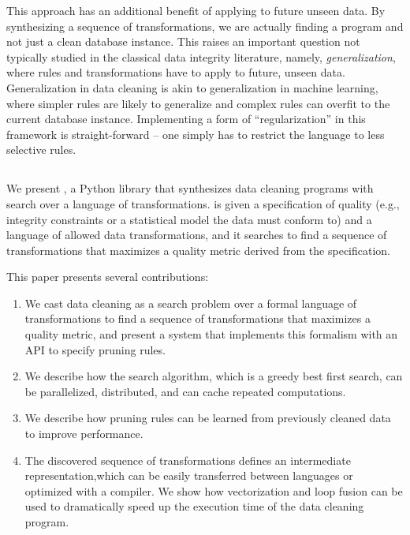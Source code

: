 This approach has an additional benefit of applying to future unseen data.
By synthesizing a sequence of transformations, we are actually finding a program and not just a clean database instance.
This raises an important question not typically studied in the classical data integrity literature, namely, \emph{generalization}, where rules and transformations have to apply to future, unseen data.
Generalization in data cleaning is akin to generalization in machine learning, where simpler rules are likely to generalize and complex rules can overfit to the current database instance.
Implementing a form of ``regularization'' in this framework is straight-forward -- one simply has to restrict the language to less selective rules.



\subsection*{\sys}
We present \sys, a Python library that synthesizes data cleaning programs with search over a language of transformations.  
\sys is given a specification of quality (e.g., integrity constraints or a statistical model the data must conform to) and a language  of  allowed  data  transformations,  and  it  searches  to find a sequence of transformations that maximizes a quality metric derived from the specification.  

This paper presents several contributions:
\begin{enumerate}
\item We cast data cleaning as a search problem over a formal language of transformations to find a sequence of transformations that maximizes a quality metric, and present a system that implements this formalism with an API to specify pruning rules.
\item We describe how the search algorithm, which is a greedy best first search, can be parallelized, distributed, and can cache repeated computations.
\item We describe how pruning rules can be learned from previously cleaned data to improve performance.
\item The discovered  sequence of  transformations  defines  an  intermediate  representation,which can be easily transferred between languages or optimized with a compiler. We show how vectorization and loop fusion can be used to dramatically speed up the execution time of the data cleaning program.
\end{enumerate}
























